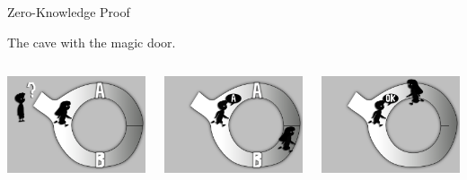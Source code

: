 \documentclass{beamer}
\begin{document}
\begin{frame}[t]{Zero-Knowledge Proof}
	\begin{center}
		The cave with the magic door.
	\end{center}
	\begin{columns}
		\begin{column}{0.3\textwidth}
			\includegraphics[width=\linewidth]{graficoJL_ZKP_1}
		\end{column}
		\begin{column}{0.3\textwidth}
			\includegraphics[width=\linewidth]{graficoJL_ZKP_2}
		\end{column}
		\begin{column}{0.3\textwidth}
			\includegraphics[width=\linewidth]{graficoJL_ZKP_3}

\end{column}
\end{columns}
\end{frame}
\end{document}
